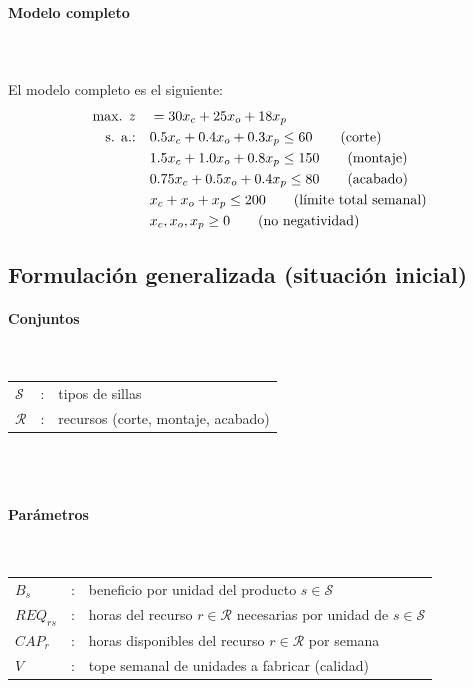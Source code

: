 \paragraph{Modelo completo}\mbox{}\\
\\
El modelo completo es el siguiente:
\begin{align}
\mbox{max. } z \quad & = 30x_c + 25x_o + 18x_p \notag \\
\mbox{s. a.:} \quad 
& 0.5x_c + 0.4x_o + 0.3x_p \leq 60 \qquad \mbox{(corte)} \notag \\
& 1.5x_c + 1.0x_o + 0.8x_p \leq 150 \qquad \mbox{(montaje)} \notag \\
& 0.75x_c + 0.5x_o + 0.4x_p \leq 80 \qquad \mbox{(acabado)} \notag \\
& x_c + x_o + x_p \leq 200 \qquad \mbox{(límite total semanal)} \notag \\
& x_c, x_o, x_p \geq 0 \qquad \mbox{(no negatividad)} \notag
\end{align}

\subsection{Formulación generalizada (situación inicial)}

\paragraph{Conjuntos}\mbox{}\\
\begin{tabular}{l c l}
    $\mathcal{S}$  & : & tipos de sillas \\
    $\mathcal{R}$  & : & recursos (corte, montaje, acabado)\\
\end{tabular}
\\
\\

\paragraph{Parámetros}\mbox{}\\
\begin{tabular}{l c l}
    $B_s$     & : & beneficio por unidad del producto $s \in \mathcal{S}$ \\
    $REQ_{rs}$& : & horas del recurso $r \in \mathcal{R}$ necesarias por unidad de $s \in \mathcal{S}$ \\
    $CAP_r$   & : & horas disponibles del recurso $r \in \mathcal{R}$ por semana \\
    $V$       & : & tope semanal de unidades a fabricar (calidad)\\
\end{tabular}
\\
\\

